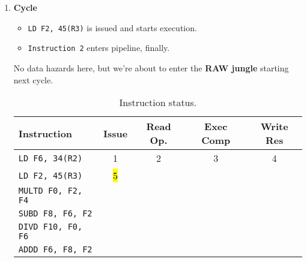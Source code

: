 \begin{enumerate}
    \newpage


    \item \textbf{Cycle \theenumi}
    \begin{itemize}
        \item \texttt{LD F2, 45(R3)} is issued and starts execution.
        \item \texttt{Instruction 2} enters pipeline, finally.
    \end{itemize}
    No data hazards here, but we're about to enter the \textbf{RAW jungle} starting next cycle.

    \begin{table}[!htp]
        \centering
        \begin{tabular}{@{} l | c c c c @{}}
            \toprule
            Instruction                 & Issue & Read Op.  & Exec Comp & Write Res \\
            \midrule
            \texttt{LD    F6, 34(R2)}   & 1     & 2         & 3         & 4         \\ [.3em]
            \texttt{LD    F2, 45(R3)}   & \hl{5}&           &           &           \\ [.3em]
            \texttt{MULTD F0, F2, F4}   &       &           &           &           \\ [.3em]
            \texttt{SUBD  F8, F6, F2}   &       &           &           &           \\ [.3em]
            \texttt{DIVD  F10, F0, F6}  &       &           &           &           \\ [.3em]
            \texttt{ADDD  F6, F8, F2}   &       &           &           &           \\
            \bottomrule
        \end{tabular}
        \caption*{Instruction status.}
    \end{table}


\end{enumerate}
